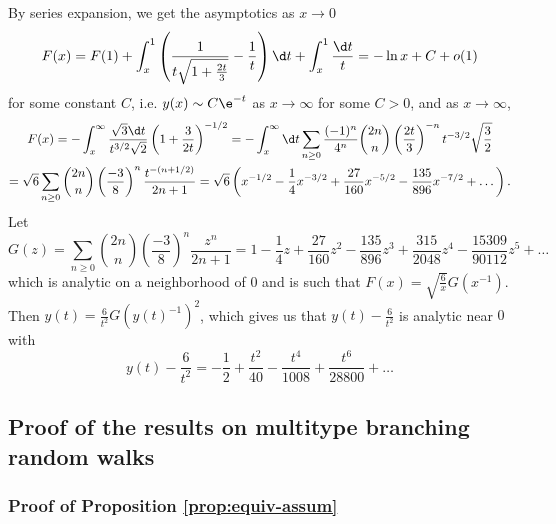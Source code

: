 \documentclass[10pt,a4paper]{article}
\begin{document}
By series expansion, we get the asymptotics as $x\to 0$
\[ F(x) = F(1) + \int_x^1 \left(\frac{1}{t\sqrt{1+\frac{2t}3}} - \frac{1}{t}\right)\d t + \int_x^1 \frac{\d t}{t} = -\ln x + C + o(1) \]
for some constant $C$, i.e. $y(x) \sim C \e^{-t}$ as $x\to\infty$ for some $C>0$, and as $x\to\infty$, 
\begin{multline*}
F(x) = -\int_x^\infty \frac{\sqrt{3}\d t}{t^{3/2}\sqrt{2}} \left(1+\frac{3}{2t}\right)^{-1/2} = -\int_x^\infty \d t \sum_{n\geq 0} \frac{(-1)^n}{4^n} {{2n}\choose n} \left(\frac{2t}{3}\right)^{-n} t^{-3/2} \sqrt{\frac{3}{2}} \\
= \sqrt{6} \sum_{n\geq 0} {{2n}\choose n} \left(\frac{-3}{8}\right)^n \frac{ t^{-(n+1/2)}}{2n+1} = \sqrt{6} \left( x^{-1/2} - \frac{1}{4} x^{-3/2} + \frac{27}{160} x^{-5/2} - \frac{135}{896} x^{-7/2} + \dots \right) .
\end{multline*}
Let
\[ G(z) = \sum_{n\geq 0} {{2n}\choose n} \left(\frac{-3}{8}\right)^n \frac{z^n}{2n+1} = 1 - \frac{1}{4} z + \frac{27}{160} z^2 - \frac{135}{896} z^3 + \frac{315}{2048} z^4 - \frac{15309}{90112} z^5 + \dots \]
which is analytic on a neighborhood of $0$ and is such that $F(x) = \sqrt{\frac{6}{x}} G(x^{-1})$. Then $y(t) = \frac{6}{t^2} G(y(t)^{-1})^2$, which gives us that $y(t) - \frac{6}{t^2}$ is analytic near $0$ with
\begin{equation}\label{eq:psi-expansion}
y(t) - \frac{6}{t^2} = - \frac{1}{2} + \frac{t^2}{40} - \frac{t^4}{1008} + \frac{t^6}{28800} + \dots
\end{equation}





\subsection{Proof of the results on multitype branching random walks}
\label{sec:proof-multitype}

\subsubsection{Proof of Proposition \ref{prop:equiv-assum}}
\end{document}
